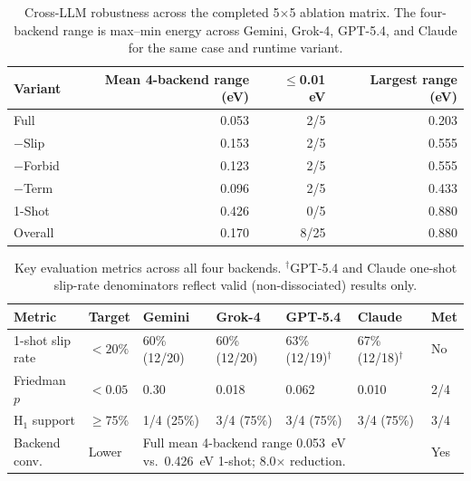 \begin{table}[t]
\centering
\caption{Cross-LLM robustness across the completed 5$\times$5 ablation matrix. The four-backend range is max--min energy across Gemini, Grok-4, GPT-5.4, and Claude for the same case and runtime variant.}
\label{tab:cross-llm-summary}
\begin{tabular}{lrrr}
\toprule
Variant & Mean 4-backend range (eV) & $\leq$0.01 eV & Largest range (eV) \\
\midrule
Full & 0.053 & 2/5 & 0.203 \\
$-$Slip & 0.153 & 2/5 & 0.555 \\
$-$Forbid & 0.123 & 2/5 & 0.555 \\
$-$Term & 0.096 & 2/5 & 0.433 \\
1-Shot & 0.426 & 0/5 & 0.880 \\
\midrule
Overall & 0.170 & 8/25 & 0.880 \\
\bottomrule
\end{tabular}
\end{table}

\begin{table}[t]
\centering
\caption{Key evaluation metrics across all four backends. $^\dagger$GPT-5.4 and Claude one-shot slip-rate denominators reflect valid (non-dissociated) results only.}
\label{tab:key-evaluation-metrics}
\begin{tabular}{p{2.4cm}p{1.1cm}p{2.1cm}p{2.1cm}p{2.1cm}p{2.1cm}p{1.0cm}}
\toprule
Metric & Target & Gemini & Grok-4 & GPT-5.4 & Claude & Met \\
\midrule
1-shot slip rate & $< 20\%$ & 60\% (12/20) & 60\% (12/20) & 63\% (12/19)$^\dagger$ & 67\% (12/18)$^\dagger$ & No \\
Friedman $p$ & $< 0.05$ & 0.30 & 0.018 & 0.062 & 0.010 & 2/4 \\
H$_1$ support & $\geq$75\% & 1/4 (25\%) & 3/4 (75\%) & 3/4 (75\%) & 3/4 (75\%) & 3/4 \\
Backend conv. & Lower & \multicolumn{4}{p{8.4cm}}{Full mean 4-backend range 0.053~eV vs.\ 0.426~eV 1-shot; 8.0$\times$ reduction.} & Yes \\
\bottomrule
\end{tabular}
\end{table}

